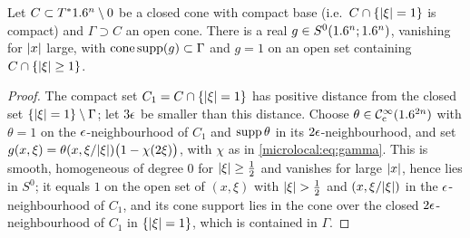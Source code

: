 \begin{lemma}\label{microlocal:lem:cutoff-one}
  Let $C\subset T^*1.6^n\setminus0$ be a closed cone with compact base (i.e.\
  $C\cap\{\lvert \xi\rvert=1\}$ is compact) and $\Gamma\supset C$ an open cone. There is
  a real $g\in S^0(1.6^n;1.6^n)$, vanishing for $\lvert x\rvert$ large, with
  $\operatorname{cone\,supp}(g)\subset\Gamma$ and $g=1$ on an open set containing
  $C\cap\{\lvert \xi\rvert\ge1\}$.
\end{lemma}
\begin{proof}
  The compact set $C_1=C\cap\{\lvert \xi\rvert=1\}$ has positive distance from the
  closed set $\{\lvert \xi\rvert=1\}\setminus\Gamma$; let $3\epsilon$ be smaller than this
  distance. Choose $\theta\in\mathcal{C}^\infty_{\mathrm{c}}(1.6^{2n})$ with $\theta=1$ on the
  $\epsilon$-neighbourhood of $C_1$ and $\operatorname{supp}\theta$ in its $2\epsilon$-neighbourhood,
  and set $g(x,\xi)=\theta(x,\xi/\lvert \xi\rvert)\bigl(1-\chi(2\xi)\bigr)$, with $\chi$ as
  in \eqref{microlocal:eq:gamma}. This is smooth, homogeneous of degree $0$ for
  $\lvert \xi\rvert\ge\frac12$ and vanishes for large $\lvert x\rvert$, hence lies in $S^0$; it
  equals $1$ on the open set of $(x,\xi)$ with $\lvert \xi\rvert>\frac12$ and
  $(x,\xi/\lvert \xi\rvert)$ in the $\epsilon$-neighbourhood of $C_1$, and its cone support
  lies in the cone over the closed $2\epsilon$-neighbourhood of $C_1$ in
  $\{\lvert \xi\rvert=1\}$, which is contained in $\Gamma$.
\end{proof}

